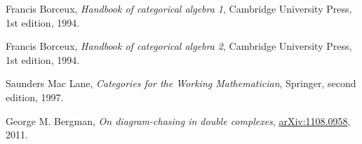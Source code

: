 \begin{thebibliography}{9}

  Francis Borceux,
  \textit{Handbook of categorical algebra 1},
  Cambridge University Press,
  1st edition,
  1994.

  Francis Borceux,
  \textit{Handbook of categorical algebra 2},
  Cambridge University Press,
  1st edition,
  1994.

  Saunders Mac Lane,
  \textit{Categories for the Working Mathematician},
  Springer,
  second edition,
  1997.

  George M. Bergman,
  \textit{On diagram-chasing in double complexes},
  \href{https://arxiv.org/abs/1108.0958}{arXiv:1108.0958},
  2011.

\end{thebibliography}

